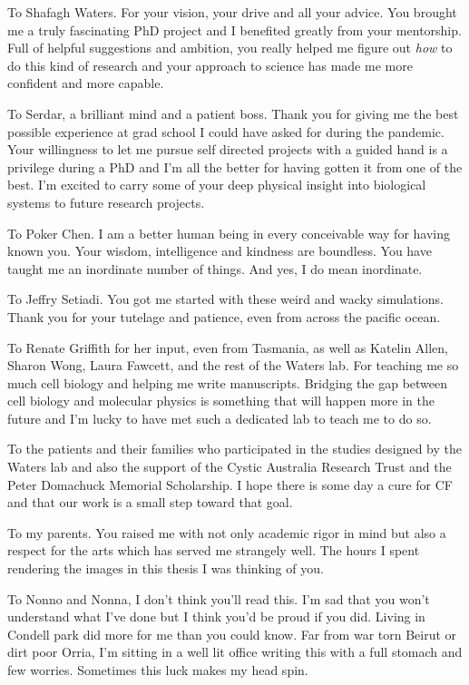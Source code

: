 To Shafagh Waters. For your vision, your drive and all your advice. You brought me a truly fascinating PhD project and I benefited greatly from your mentorship. Full of helpful suggestions and ambition, you really helped me figure out \textit{how} to do this kind of research and your approach to science has made me more confident and more capable.

To Serdar, a brilliant mind and a patient boss. Thank you for giving me the best possible experience at grad school I could have asked for during the pandemic. Your willingness to let me pursue self directed projects with a guided hand is a privilege during a PhD and I'm all the better for having gotten it from one of the best. I'm excited to carry some of your deep physical insight into biological systems to future research projects. 

To Poker Chen. I am a better human being in every conceivable way for having known you. Your wisdom, intelligence and kindness are boundless. You have taught me an inordinate number of things. And yes, I do mean inordinate.

To Jeffry Setiadi. You got me started with these weird and wacky simulations. Thank you for your tutelage and patience, even from across the pacific ocean.

To Renate Griffith for her input, even from Tasmania, as well as Katelin Allen, Sharon Wong, Laura Fawcett, and the rest of the Waters lab. For teaching me so much cell biology and helping me write manuscripts. Bridging the gap between cell biology and molecular physics is something that will happen more in the future and I'm lucky to have met such a dedicated lab to teach me to do so.

To the patients and their families who participated in the studies designed by the Waters lab and also the support of the Cystic Australia Research Trust and the Peter Domachuck Memorial Scholarship. I hope there is some day a cure for CF and that our work is a small step toward that goal.

To my parents. You raised me with not only academic rigor in mind but also a respect for the arts which has served me strangely well. The hours I spent rendering the images in this thesis I was thinking of you.

To Nonno and Nonna, I don't think you'll read this. I'm sad that you won't understand what I've done but I think you'd be proud if you did. Living in Condell park did more for me than you could know. Far from war torn Beirut or dirt poor Orria, I'm sitting in a well lit office writing this with a full stomach and few worries. Sometimes this luck makes my head spin. 

